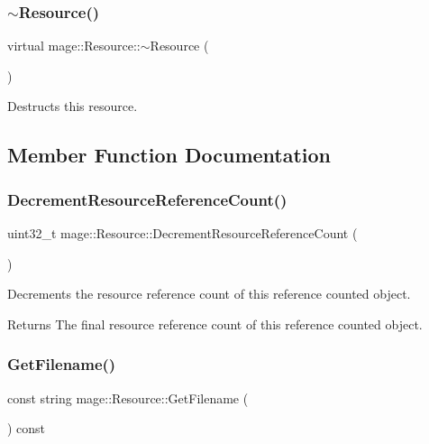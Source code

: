 \subsubsection{\texorpdfstring{$\sim$\+Resource()}{~Resource()}}
{\footnotesize\ttfamily virtual mage\+::\+Resource\+::$\sim$\+Resource (\begin{DoxyParamCaption}{ }\end{DoxyParamCaption})\hspace{0.3cm}{\ttfamily [virtual]}}

Destructs this resource. 

\subsection{Member Function Documentation}
\hypertarget{classmage_1_1_resource_a225b37285aa32d893a07d5b492ea99f9}{}\label{classmage_1_1_resource_a225b37285aa32d893a07d5b492ea99f9} 
\subsubsection{\texorpdfstring{Decrement\+Resource\+Reference\+Count()}{DecrementResourceReferenceCount()}}
{\footnotesize\ttfamily uint32\+\_\+t mage\+::\+Resource\+::\+Decrement\+Resource\+Reference\+Count (\begin{DoxyParamCaption}{ }\end{DoxyParamCaption})\hspace{0.3cm}{\ttfamily [private]}}

Decrements the resource reference count of this reference counted object.

\begin{DoxyReturn}{Returns}
The final resource reference count of this reference counted object. 
\end{DoxyReturn}
\hypertarget{classmage_1_1_resource_a3235bf2744390d5957b9b4038e4bb512}{}\label{classmage_1_1_resource_a3235bf2744390d5957b9b4038e4bb512} 
\subsubsection{\texorpdfstring{Get\+Filename()}{GetFilename()}}
{\footnotesize\ttfamily const string mage\+::\+Resource\+::\+Get\+Filename (\begin{DoxyParamCaption}{ }\end{DoxyParamCaption}) const}

